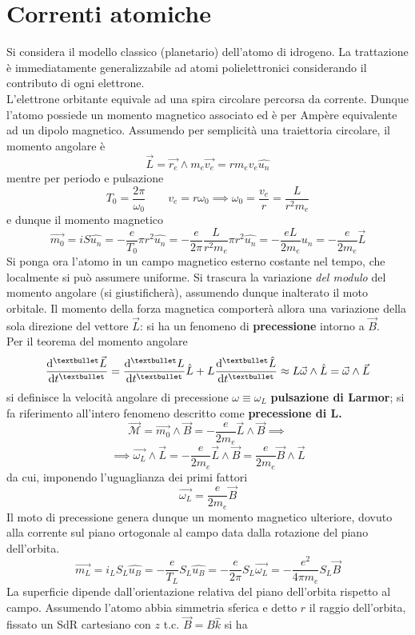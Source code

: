 \section{Correnti atomiche}
Si considera il modello classico (planetario) dell'atomo di idrogeno. La trattazione è immediatamente generalizzabile ad atomi polielettronici considerando il contributo di ogni elettrone.
\\L'elettrone orbitante equivale ad una spira circolare percorsa da corrente. Dunque l'atomo possiede un momento magnetico associato ed è per Ampère equivalente ad un dipolo magnetico. Assumendo per semplicità una traiettoria circolare, il momento angolare è 
\[\vec{L} = \vec{r_e} \wedge m_e \vec{v_e} = r m_e v_e \hat{u_n}\]
mentre per periodo e pulsazione
\[T_0 = \frac{2\pi}{\omega_0} \qquad v_e = r \omega_0 \implies \omega_0 = \frac{v_e}{r} = \frac{L}{r^2 m_e}\]
e dunque il momento magnetico
\[\vec{m_0} = i S \hat{u_n} = - \frac{e}{T_0} \pi r^2 \hat{u_n} = - \frac{e}{2 \pi} \frac{L}{r^2 m_e} \pi r^2 \hat{u_n} = - \frac{eL}{2 m_e} \hat{u_n} = - \frac{e}{2 m_e} \vec{L}\]
Si ponga ora l'atomo in un campo magnetico esterno costante nel tempo, che localmente si può assumere uniforme. Si trascura la variazione \textit{del modulo} del momento angolare (si giustificherà), assumendo dunque inalterato il moto orbitale. Il momento della forza magnetica comporterà allora una variazione della sola direzione del vettore $\vec{L}$: si ha un fenomeno di \textbf{precessione} intorno a $\vec{B}$.
\\Per il teorema del momento angolare
\[\dv[•]{\vec{L}}{t} = \dv[•]{L}{t} \hat{L} + L \dv[•]{\hat{L}}{t} \approx L \vec{\omega} \wedge \hat{L} = \vec{\omega} \wedge \vec{L}\]
si definisce la velocità angolare di precessione $\omega \equiv \omega_L$ \textbf{pulsazione di Larmor}; si fa riferimento all'intero fenomeno descritto come \textbf{precessione di L.}
\[\vec{\mathcal{M}} = \vec{m_0} \wedge \vec{B} = - \frac{e}{2 m_e} \vec{L} \wedge \vec{B} \implies\]
\[\implies \vec{\omega_L} \wedge \vec{L} = - \frac{e}{2 m_e} \vec{L} \wedge \vec{B} = \frac{e}{2 m_e} \vec{B} \wedge \vec{L}\]
da cui, imponendo l'uguaglianza dei primi fattori
\[\vec{\omega_L} = \frac{e}{2 m_e} \vec{B}\]
Il moto di precessione genera dunque un momento magnetico ulteriore, dovuto alla corrente sul piano ortogonale al campo data dalla rotazione del piano dell'orbita.
\[\vec{m_L} = i_L S_L \hat{u_B} = - \frac{e}{T_L} S_L \hat{u_B} = - \frac{e}{2 \pi} S_L \vec{\omega_L} = - \frac{e^2}{4 \pi m_e} S_L \vec{B}\]
La superficie dipende dall'orientazione relativa del piano dell'orbita rispetto al campo. Assumendo l'atomo abbia simmetria sferica e detto $r$ il raggio dell'orbita, fissato un SdR cartesiano con $z$ t.c. $\vec{B} = B \hat{k}$ si ha
